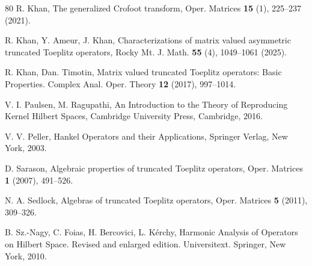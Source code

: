 \documentclass{amsart}
\theoremstyle{definition}
\begin{document}
\begin{thebibliography}{80}
R. Khan, The generalized Crofoot transform, Oper. Matrices {\bf15} (1), 225--237 (2021).

R. Khan, Y. Ameur, J. Khan, Characterizations of matrix valued asymmetric truncated Toeplitz operators, Rocky Mt. J. Math. {\bf 55} (4), 1049--1061 (2025).

{R. Khan, Dan. Timotin}, Matrix valued truncated Toeplitz operators: Basic Properties. Complex Anal. Oper. Theory {\bf 12} (2017), 997--1014.





V. I. Paulsen, M. Ragupathi, An Introduction to the Theory
of Reproducing Kernel Hilbert Spaces, Cambridge University Press, Cambridge, 2016.

V. V. Peller, Hankel Operators and their Applications, Springer Verlag, New York, 2003.

  D. Sarason, Algebraic properties of truncated Toeplitz operators,  Oper. Matrices {\bf 1}
(2007),  491--526.

N. A. Sedlock, Algebras of truncated Toeplitz operators, Oper. Matrices {\bf 5} (2011), 309--326.


 B. Sz.-Nagy,  C. Foias, H. Bercovici, L. K\'erchy, Harmonic Analysis of Operators on Hilbert Space.  Revised and enlarged edition. Universitext. Springer, New York, 2010.

\end{thebibliography}
\end{document}
